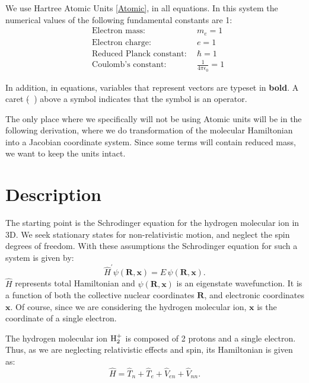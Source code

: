 We use Hartree Atomic Units \eqref{Atomic}, in all equations. In this system the numerical values of the following fundamental constants are 1:
\setlength{\mathindent}{0pt}
\begin{equation}\label{Atomic}
\begin{split}
    & \text{Electron mass:}\ &\ m_e = 1 \\ 
    & \text{Electron charge:}\ &\ e = 1 \\
    & \text{Reduced Planck constant:}\ &\ \hbar = 1 \\
    & \text{Coulomb's constant:}\ &\ \frac{1}{4\pi\epsilon_0} = 1
\end{split}
\end{equation}

In addition, in equations, variables that represent vectors are typeset in \textbf{bold}. A caret ($ \hat{}\ $ ) above a symbol indicates that the symbol is an operator.

The only place where we specifically will not be using Atomic units will be in the following derivation, where we do transformation of the molecular Hamiltonian into a Jacobian coordinate system. Since some terms will contain reduced mass, we want to keep the units intact.

\section{Description}
The starting point is the Schrodinger equation for the hydrogen molecular ion in 3D. We 
seek stationary states for non-relativistic motion, and neglect the spin degrees of freedom. With these assumptions the Schrodinger equation for such a system is given by:
\begin{equation}\label{sch1}
\hat{H}^{'}\psi\left(\mathbf{R},\mathbf{x}\right) = E\,\psi\left(\mathbf{R},\mathbf{x}\right).
\end{equation}
$ \hat{H} $ represents total Hamiltonian and $ \psi\left(\mathbf{R},\mathbf{x}\right) $ is an eigenstate wavefunction. It is a function of both the collective nuclear coordinates $ \mathbf{R} $,  and electronic coordinates $\mathbf{x} $. Of course, since we are considering the hydrogen molecular ion, $\mathbf{x} $ is the coordinate of a single electron.

The hydrogen molecular ion $ {\rm H}_2^{+} $ is composed of 2 protons and a single electron. Thus, as we are neglecting relativistic effects and spin, its Hamiltonian is given as:
\begin{equation}\label{hh}
\hat{H} = \hat{T}_n + \hat{T}_e + \hat{V}_{en} + \hat{V}_{nn}. 
\end{equation}

